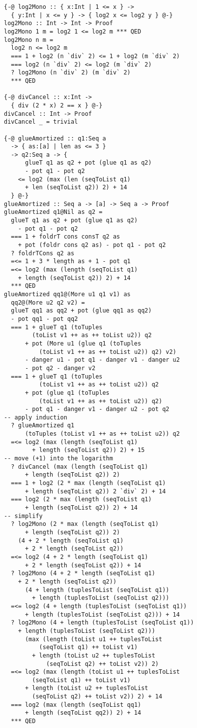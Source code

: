 \documentclass[sigplan,screen]{acmart}
\begin{document}
\begin{lstlisting}
{-@ log2Mono :: { x:Int | 1 <= x } ->
  { y:Int | x <= y } -> { log2 x <= log2 y } @-}
log2Mono :: Int -> Int -> Proof
log2Mono 1 m = log2 1 <= log2 m *** QED
log2Mono n m =
  log2 n <= log2 m
  === 1 + log2 (n `div` 2) <= 1 + log2 (m `div` 2)
  === log2 (n `div` 2) <= log2 (m `div` 2)
  ? log2Mono (n `div` 2) (m `div` 2)
  *** QED

{-@ divCancel :: x:Int ->
  { div (2 * x) 2 == x } @-}
divCancel :: Int -> Proof
divCancel _ = trivial

{-@ glueAmortized :: q1:Seq a
  -> { as:[a] | len as <= 3 }
  -> q2:Seq a -> {
      glueT q1 as q2 + pot (glue q1 as q2)
      - pot q1 - pot q2
    <= log2 (max (len (seqToList q1)
      + len (seqToList q2)) 2) + 14
  } @-}
glueAmortized :: Seq a -> [a] -> Seq a -> Proof
glueAmortized q1@Nil as q2 =
  glueT q1 as q2 + pot (glue q1 as q2)
    - pot q1 - pot q2
  === 1 + foldrT cons consT q2 as
    + pot (foldr cons q2 as) - pot q1 - pot q2
  ? foldrTCons q2 as
  =<= 1 + 3 * length as + 1 - pot q1
  =<= log2 (max (length (seqToList q1)
    + length (seqToList q2)) 2) + 14
  *** QED
glueAmortized qq1@(More u1 q1 v1) as
  qq2@(More u2 q2 v2) =
  glueT qq1 as qq2 + pot (glue qq1 as qq2)
  - pot qq1 - pot qq2
  === 1 + glueT q1 (toTuples
        (toList v1 ++ as ++ toList u2)) q2
      + pot (More u1 (glue q1 (toTuples
          (toList v1 ++ as ++ toList u2)) q2) v2)
      - danger u1 - pot q1 - danger v1 - danger u2
      - pot q2 - danger v2
  === 1 + glueT q1 (toTuples
          (toList v1 ++ as ++ toList u2)) q2
      + pot (glue q1 (toTuples
          (toList v1 ++ as ++ toList u2)) q2)
      - pot q1 - danger v1 - danger u2 - pot q2
-- apply induction
  ? glueAmortized q1
      (toTuples (toList v1 ++ as ++ toList u2)) q2
  =<= log2 (max (length (seqToList q1)
        + length (seqToList q2)) 2) + 15
-- move (+1) into the logarithm
  ? divCancel (max (length (seqToList q1)
      + length (seqToList q2)) 2)
  === 1 + log2 (2 * max (length (seqToList q1)
      + length (seqToList q2)) 2 `div` 2) + 14
  === log2 (2 * max (length (seqToList q1)
      + length (seqToList q2)) 2) + 14
-- simplify
  ? log2Mono (2 * max (length (seqToList q1)
      + length (seqToList q2)) 2)
    (4 + 2 * length (seqToList q1)
      + 2 * length (seqToList q2))
  =<= log2 (4 + 2 * length (seqToList q1)
      + 2 * length (seqToList q2)) + 14
  ? log2Mono (4 + 2 * length (seqToList q1)
    + 2 * length (seqToList q2))
      (4 + length (tuplesToList (seqToList q1))
        + length (tuplesToList (seqToList q2)))
  =<= log2 (4 + length (tuplesToList (seqToList q1))
      + length (tuplesToList (seqToList q2))) + 14
  ? log2Mono (4 + length (tuplesToList (seqToList q1))
    + length (tuplesToList (seqToList q2))) 
      (max (length (toList u1 ++ tuplesToList
          (seqToList q1) ++ toList v1)
        + length (toList u2 ++ tuplesToList
            (seqToList q2) ++ toList v2)) 2)
  =<= log2 (max (length (toList u1 ++ tuplesToList
        (seqToList q1) ++ toList v1)
      + length (toList u2 ++ tuplesToList
        (seqToList q2) ++ toList v2)) 2) + 14
  === log2 (max (length (seqToList qq1)
      + length (seqToList qq2)) 2) + 14
  *** QED
\end{lstlisting}
\end{document}
